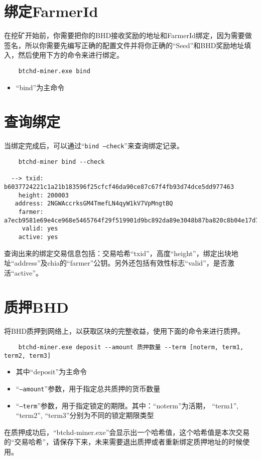 \section{绑定FarmerId}
\begin{flushleft}
    在挖矿开始前，你需要把你的BHD接收奖励的地址和FarmerId绑定，因为需要做签名，所以你需要先编写正确的配置文件并将你正确的``Seed''和BHD奖励地址填入，然后使用下方的命令来进行绑定。
\end{flushleft}
\scriptsize
\begin{verbatim}
    btchd-miner.exe bind
\end{verbatim}
\normalsize
\begin{itemize}
    \item ``bind''为主命令
\end{itemize}
\section{查询绑定}
\begin{flushleft}
    当绑定完成后，可以通过``\texttt{bind --check}''来查询绑定记录。
\end{flushleft}
\scriptsize
\begin{verbatim}
    btchd-miner bind --check

  --> txid: b6037724221c1a21b183596f25cfcf46da90ce87c67f4fb93d74dce5dd977463
    height: 200003
   address: 2NGWAccrksGM4TmefLN4qyW1kV7VpMngtBQ
    farmer: a7ecb9581e69e4ce968e5465764f29f519901d9bc892da89e3048b87ba820c8b04e17d726bfbb236e3f0e33f8a83851e
     valid: yes
    active: yes
\end{verbatim}
\normalsize
\begin{flushleft}
    查询出来的绑定交易信息包括：交易哈希``txid''，高度``height''，绑定出块地址``address''及chia的``farmer''公钥。另外还包括有效性标志``valid''，是否激活``active''。
\end{flushleft}
\section{质押BHD}
\begin{flushleft}
    将BHD质押到网络上，以获取区块的完整收益，使用下面的命令来进行质押。
\end{flushleft}
\scriptsize
\begin{verbatim}
    btchd-miner.exe deposit --amount 质押数量 --term [noterm, term1, term2, term3]
\end{verbatim}
\normalsize
\begin{itemize}
    \item 其中``deposit''为主命令
    \item ``\texttt{--amount}''参数，用于指定总共质押的货币数量
    \item ``\texttt{--term}''参数，用于指定锁定的期限。其中：``noterm''为活期， ``term1'', ``term2'', ``term3''分别为不同的锁定期限类型
\end{itemize}
\begin{flushleft}
    在质押成功后，``btchd-miner.exe''会显示出一个哈希值，这个哈希值是本次交易的``交易哈希''，请保存下来，未来需要退出质押或者重新绑定质押地址的时候使用。
\end{flushleft}
